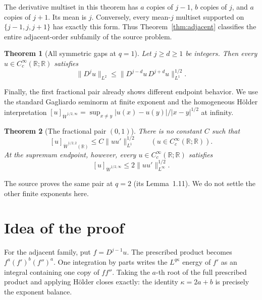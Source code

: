 \documentclass[11pt]{article}
\newtheorem{theorem}{Theorem}
\newcommand{\R}{\mathbb R}
\newcommand{\seminorm}[1]{\left[#1\right]_{\dot W^{1/2,\infty}}}
\begin{document}
The derivative multiset in this theorem has $a$ copies of $j-1$, $b$ copies
of $j$, and $a$ copies of $j+1$.  Its mean is $j$.  Conversely, every
mean-$j$ multiset supported on $\{j-1,j,j+1\}$ has exactly this form.  Thus
Theorem~\ref{thm:adjacent} classifies the entire adjacent-order subfamily of
the source problem.

\begin{theorem}[All symmetric gaps at $q=1$]\label{thm:gaps}
Let $j\ge d\ge1$ be integers.  Then every $u\in C_c^\infty(\R;\R)$ satisfies
\begin{equation}\label{eq:gaps}
 \|D^j u\|_{L^2}
 \le \big\|D^{j-d}u\,D^{j+d}u\big\|_{L^1}^{1/2}.
\end{equation}
\end{theorem}

Finally, the first fractional pair already shows different endpoint
behavior.  We use the standard Gagliardo seminorm at finite exponent and the
homogeneous H\"older interpretation
\(\seminorm{u}=\sup_{x\ne y}|u(x)-u(y)|/|x-y|^{1/2}\) at infinity.

\begin{theorem}[The fractional pair $(0,1)$]\label{thm:fractional}
There is no constant $C$ such that
\begin{equation}\label{eq:frac-one}
 [u]_{\dot W^{1/2,2}(\R)}
 \le C\|uu'\|_{L^1}^{1/2}
 \qquad(u\in C_c^\infty(\R;\R)).
\end{equation}
At the supremum endpoint, however, every $u\in C_c^\infty(\R;\R)$ satisfies
\begin{equation}\label{eq:frac-infty}
 \seminorm{u}\le2\|uu'\|_{L^\infty}^{1/2}.
\end{equation}
\end{theorem}

The source proves the same pair at $q=2$ (its Lemma~1.11).  We do not settle
the other finite exponents here.

\section{Idea of the proof}

For the adjacent family, put $f=D^{j-1}u$.  The prescribed product becomes
$f^a(f')^b(f'')^a$.  One integration by parts writes the $L^{q\kappa}$
energy of $f'$ as an integral containing one copy of $ff''$.  Taking the
$a$-th root of the full prescribed product and applying H\"older closes
exactly: the identity $\kappa=2a+b$ is precisely the exponent balance.
\end{document}

